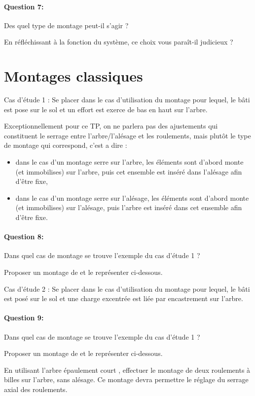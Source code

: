 \paragraph{Question 7:} Des quel type de montage peut-il s'agir ?

En réfléchissant à la fonction du système, ce choix vous paraît-il judicieux ? 

\section{Montages classiques}

Cas d'étude 1 : Se placer dans le cas d'utilisation du montage pour lequel, le bâti est pose sur le sol et un effort est exerce de bas en haut sur l'arbre.

Exceptionnellement pour ce TP, on ne parlera pas des ajustements qui constituent le serrage entre l'arbre/l'alésage et les roulements, mais plutôt le type de montage qui correspond, c'est a dire :
\begin{itemize}
 \item dans le cas d'un montage serre sur l'arbre, les éléments sont d'abord monte (et immobilises) sur l'arbre, puis cet ensemble est inséré dans l'alésage afin d'être fixe,
 \item dans le cas d'un montage serre sur l'alésage, les éléments sont d'abord monte (et immobilises) sur l'alésage, puis l'arbre est inséré dans cet ensemble afin d'être fixe.
\end{itemize}

\paragraph{Question 8:} Dans quel cas de montage se trouve l'exemple du cas d'étude 1 ?

Proposer un montage de et le représenter ci-dessous.

Cas d'étude 2 : Se placer dans le cas d'utilisation du montage pour lequel, le bâti est posé sur le sol et une charge excentrée est liée par encastrement sur l'arbre.

\paragraph{Question 9:} Dans quel cas de montage se trouve l'exemple du cas d'étude 1 ?

Proposer un montage de et le représenter ci-dessous.

En utilisant l'arbre \og épaulement court \fg, effectuer le montage de deux roulements à billes sur l'arbre, sans alésage. Ce montage devra permettre le réglage du serrage axial des roulements.

